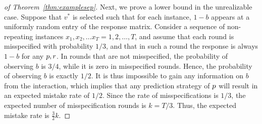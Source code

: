\documentclass[anon]{alt2027} %
\begin{document}
\begin{proof}[of Theorem~\ref{thm:examplesep}]

Next, we prove a lower bound in the unrealizable case. Suppose that $v^*$ is selected such that for each instance, $1-b$ appears at a uniformly random entry of the response matrix. Consider a sequence of non-repeating instances $x_1,x_2,\ldots x_T = 1,2,\ldots, T$, and assume that each round is misspecified with probability $1/3$, and that in such a round the response is always $1-b$ for any ${p},{r}$. In rounds that are not misspecified, the probability of observing $b$ is $3/4$, while it is zero in misspecified rounds. Hence, the probability of observing $b$ is exactly $1/2$. It is thus impossible to gain any information on $b$ from the interaction, which implies that any prediction strategy of ${p}$ will result in an expected mistake rate of $1/2$. Since the rate of misspecifications is $1/3$, the expected number of misspecification rounds is $k = T/3$. Thus, the expected mistake rate is $\frac{3}{2}k$. 
\end{proof}


\iffalse
\end{document}
